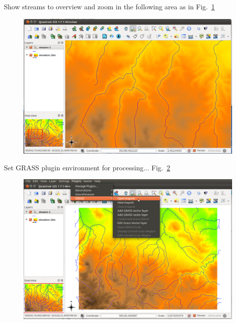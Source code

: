 Show streams to overview and zoom in the following area as in Fig.~\ref{fig:qgis028}

\begin{figure}[htbp]
   \centering
   \includegraphics[scale=0.2]{qgis028.png}
   \caption{}
   \label{fig:qgis028}
\end{figure}

Set GRASS plugin environment for processing... Fig.~\ref{fig:qgis029}

\begin{figure}[htbp]
   \centering
   \includegraphics[scale=0.25]{qgis029.png}
   \caption{}
   \label{fig:qgis029}
\end{figure}

